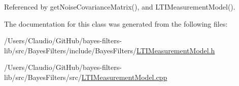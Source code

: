 Referenced by get\+Noise\+Covariance\+Matrix(), and L\+T\+I\+Measurement\+Model().



The documentation for this class was generated from the following files\+:\begin{DoxyCompactItemize}
\item 
/\+Users/\+Claudio/\+Git\+Hub/bayes-\/filters-\/lib/src/\+Bayes\+Filters/include/\+Bayes\+Filters/\mbox{\hyperlink{LTIMeasurementModel_8h}{L\+T\+I\+Measurement\+Model.\+h}}\item 
/\+Users/\+Claudio/\+Git\+Hub/bayes-\/filters-\/lib/src/\+Bayes\+Filters/src/\mbox{\hyperlink{LTIMeasurementModel_8cpp}{L\+T\+I\+Measurement\+Model.\+cpp}}\end{DoxyCompactItemize}

